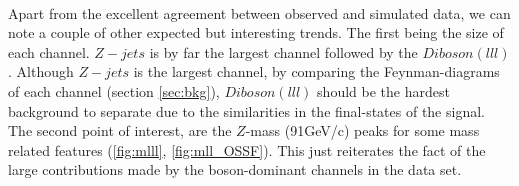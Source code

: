 \\
Apart from the excellent agreement between observed and simulated data, we can note a couple of other expected
but interesting trends. The first being the size of each channel. $Z-jets$ is by far the largest channel followed
by the $Diboson (lll)$. Although $Z-jets$ is the largest channel, by comparing the Feynman-diagrams of each channel
(section \ref{sec:bkg}), $Diboson(lll)$ should be the hardest background to separate due to the similarities in the 
final-states of the signal. The second point of interest, are the $Z$-mass (91GeV/c) peaks for some mass related features
(\ref{fig:mlll}, \ref{fig:mll_OSSF}). This just reiterates the fact of the large contributions made by the boson-dominant 
channels in the data set.
\begin{figure}
\end{figure}

